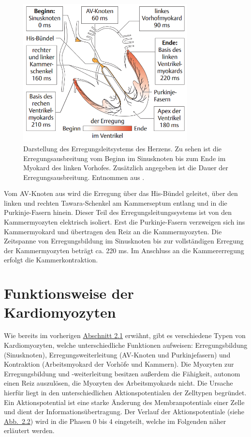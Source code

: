 \begin{figure}[!ht]%
\centering
	\includegraphics[width=0.80\textwidth]{./Bilder/HerzPhys.png}
\caption[Darstellung des Erregungsleitsystems des Herzens]{Darstellung des Erregungsleitsystems des Herzens. Zu sehen ist die Erregungsausbreitung vom Beginn im Sinusknoten bis zum Ende im Myokard des linken Vorhofes. Zusätzlich angegeben ist die Dauer der Erregungsausbreitung. Entnommen aus \cite{gekle_taschenlehrbuch_2015}.} 
\label{fig:HerzPhys}
\end{figure}  

Vom \gls{AV-Knoten} aus wird die Erregung über das His-Bündel geleitet, über den linken und rechten Tawara-Schenkel am Kammerseptum entlang und in die Purkinje-Fasern hinein. Dieser Teil des Erregungsleitungssystems ist von den Kammermyozyten elektrisch isoliert. Erst die Purkinje-Fasern verzweigen sich ins Kammermyokard und übertragen den Reiz an die Kammermyozyten. Die Zeitspanne von Erregungsbildung im Sinusknoten bis zur vollständigen Erregung der Kammermyozyten beträgt ca. 220 ms. Im Anschluss an die Kammererregung erfolgt die Kammerkontraktion.~\cite{gekle_taschenlehrbuch_2015} 

\section{Funktionsweise der Kardiomyozyten}\label{sec:myozyten}

Wie bereits im vorherigen \hyperref[sec:Erregungsleitsystem]{Abschnitt 2.1} erwähnt, gibt es verschiedene Typen von Kardiomyozyten, welche unterschiedliche Funktionen aufweisen: Erregungsbildung (Sinusknoten), Erregungsweiterleitung (\gls{AV-Knoten} und Purkinjefasern) und Kontraktion (Arbeitsmyokard der Vorhöfe und Kammern). Die Myozyten zur Erregungsbildung und -weiterleitung besitzen außerdem die Fähigkeit, autonom einen Reiz auszulösen, die Myozyten des Arbeitsmyokards nicht. Die Ursache hierfür liegt in den unterschiedlichen Aktionspotentialen der Zelltypen begründet. Ein Aktionspotential ist eine starke Änderung des Membranpotentials einer Zelle und dient der Informationsübertragung. Der Verlauf der Aktionspotentiale (siehe \hyperref[fig:Aktionspotential]{Abb.~2.2}) wird in die Phasen 0 bis 4 eingeteilt, welche im Folgenden näher erläutert werden. \cite{gekle_taschenlehrbuch_2015}

